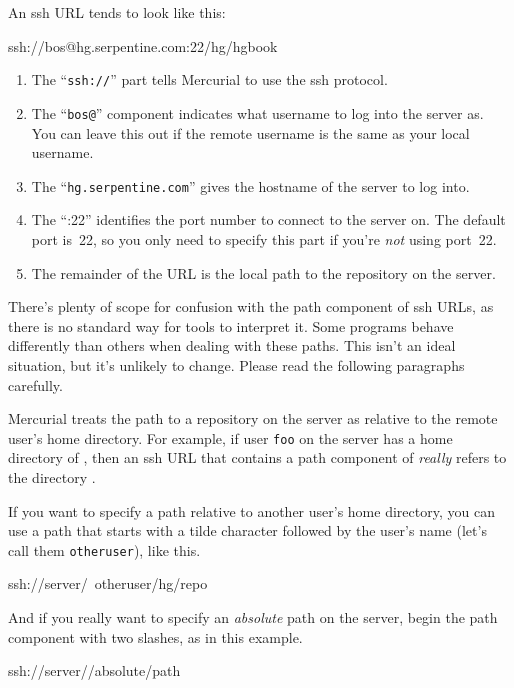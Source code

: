 An ssh URL tends to look like this:
\begin{codesample2}
  ssh://bos@hg.serpentine.com:22/hg/hgbook
\end{codesample2}
\begin{enumerate}
\item The ``\texttt{ssh://}'' part tells Mercurial to use the ssh
  protocol.
\item The ``\texttt{bos@}'' component indicates what username to log
  into the server as.  You can leave this out if the remote username
  is the same as your local username.
\item The ``\texttt{hg.serpentine.com}'' gives the hostname of the
  server to log into.
\item The ``:22'' identifies the port number to connect to the server
  on.  The default port is~22, so you only need to specify this part
  if you're \emph{not} using port~22.
\item The remainder of the URL is the local path to the repository on
  the server.
\end{enumerate}

There's plenty of scope for confusion with the path component of ssh
URLs, as there is no standard way for tools to interpret it.  Some
programs behave differently than others when dealing with these paths.
This isn't an ideal situation, but it's unlikely to change.  Please
read the following paragraphs carefully.

Mercurial treats the path to a repository on the server as relative to
the remote user's home directory.  For example, if user \texttt{foo}
on the server has a home directory of , then an ssh
URL that contains a path component of 
\emph{really} refers to the directory .

If you want to specify a path relative to another user's home
directory, you can use a path that starts with a tilde character
followed by the user's name (let's call them \texttt{otheruser}), like
this.
\begin{codesample2}
  ssh://server/~otheruser/hg/repo
\end{codesample2}

And if you really want to specify an \emph{absolute} path on the
server, begin the path component with two slashes, as in this example.
\begin{codesample2}
  ssh://server//absolute/path
\end{codesample2}

